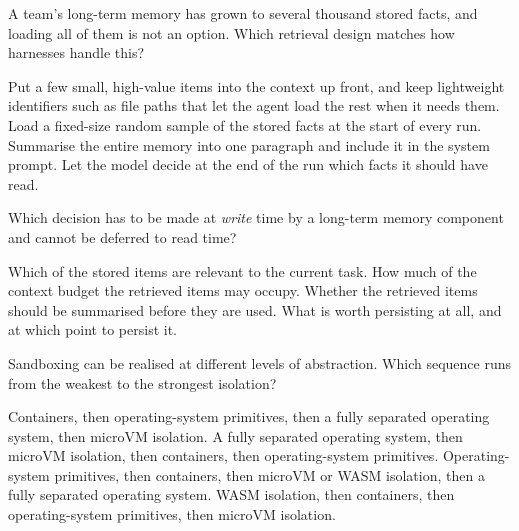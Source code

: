 
\qitem A team's long-term memory has grown to several thousand stored facts, and loading all of them is
not an option. Which retrieval design matches how harnesses handle this?
\begin{choices}
  \CorrectChoice Put a few small, high-value items into the context up front, and keep lightweight identifiers such as file paths that let the agent load the rest when it needs them.
  \choice Load a fixed-size random sample of the stored facts at the start of every run.
  \choice Summarise the entire memory into one paragraph and include it in the system prompt.
  \choice Let the model decide at the end of the run which facts it should have read.
\end{choices}
\dontknow
{}

\qitem Which decision has to be made at \emph{write} time by a long-term memory component and cannot be
deferred to read time?
\begin{choices}
  \choice Which of the stored items are relevant to the current task.
  \choice How much of the context budget the retrieved items may occupy.
  \choice Whether the retrieved items should be summarised before they are used.
  \CorrectChoice What is worth persisting at all, and at which point to persist it.
\end{choices}
\dontknow
{}



\qitem Sandboxing can be realised at different levels of abstraction. Which sequence runs from the
weakest to the strongest isolation?
\begin{choices}
  \choice Containers, then operating-system primitives, then a fully separated operating system, then microVM isolation.
  \choice A fully separated operating system, then microVM isolation, then containers, then operating-system primitives.
  \CorrectChoice Operating-system primitives, then containers, then microVM or WASM isolation, then a fully separated operating system.
  \choice WASM isolation, then containers, then operating-system primitives, then microVM isolation.
\end{choices}
\dontknow
{}

